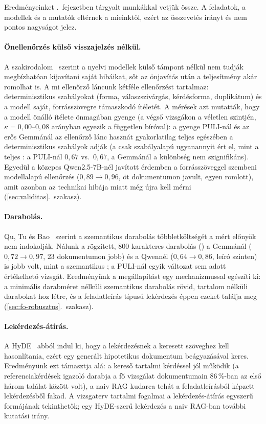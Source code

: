 Eredményeinket \az{\ref{ch:szakirodalom}}.~fejezetben tárgyalt munkákkal vetjük össze. A feladatok, a
modellek és a mutatók eltérnek a mieinktől, ezért az összevetés irányt és nem pontos nagyságot jelez.

\paragraph{Önellenőrzés külső visszajelzés nélkül.} A szakirodalom~\cite{huang2024selfcorrect} szerint a
nyelvi modellek külső támpont nélkül nem tudják megbízhatóan kijavítani saját hibáikat, sőt az önjavítás után
a teljesítmény akár romolhat is. A mi ellenőrző láncunk kétféle ellenőrzést tartalmaz: determinisztikus
szabályokat (forma, válaszszivárgás, kérdésforma, duplikátum) és a modell saját, forrásszövegre támaszkodó
ítéletét. A mérések azt mutatták, hogy a modell önálló ítélete önmagában gyenge (a végső vizsgákon a véletlen
szintjén, $\kappa=0{,}00$--$0{,}08$ arányban egyezik a független bíróval): a gyenge PULI-nál és az erős
Gemmánál az ellenőrző lánc hasznát gyakorlatilag teljes egészében a determinisztikus szabályok adják (a csak
szabályalapú  ugyanannyit ért el, mint a teljes : a PULI-nál $0{,}67$ vs.\ $0{,}67$, a
Gemmánál a különbség nem szignifikáns). Egyedül a közepes Qwen2.5-7B-nél javított érdemben a forrásszöveggel
szembeni modellalapú ellenőrzés ($0{,}89\to0{,}96$, öt dokumentumon javult, egyen romlott), amit azonban az
 technikai hibája miatt még újra kell mérni (\ref{sec:validitas}.~szakasz).

\paragraph{Darabolás.} Qu, Tu és Bao~\cite{qu2024chunking} szerint a szemantikus darabolás többletköltségét
a mért előnyök nem indokolják. Nálunk a rögzített, 800 karakteres darabolás () a Gemmánál
($0{,}72\to0{,}97$, 23 dokumentumon jobb) és a Qwennél ($0{,}64\to0{,}86$, leíró szinten) is jobb volt, mint a
szemantikus ; a PULI-nál egyik változat sem adott értékelhető vizsgát. Eredményünk a megállapítást
egy mechanizmussal egészíti ki: a minimális darabméret nélküli szemantikus darabolás rövid, tartalom nélküli
darabokat hoz létre, és a feladatleírás típusú lekérdezés éppen ezeket találja meg
(\ref{sec:fo-robusztus}.~szakasz).

\paragraph{Lekérdezés-átírás.} A HyDE~\cite{gao2023hyde} abból indul ki, hogy a lekérdezésnek a keresett
szöveghez kell hasonlítania, ezért egy generált hipotetikus dokumentum beágyazásával keres. Eredményünk ezt
támasztja alá: a kereső tartalmi kérdéssel jól működik (a referenciakérdések igazoló darabja a fő vizsgálat
dokumentumain 86\,\%-ban az első három találat között volt), a naiv RAG kudarca tehát a feladatleírásból
képzett lekérdezésből fakad. A vizsgaterv tartalmi fogalmai a lekérdezés-átírás egyszerű formájának
tekinthetők; egy HyDE-szerű lekérdezés a naiv RAG-ban további kutatási irány.

